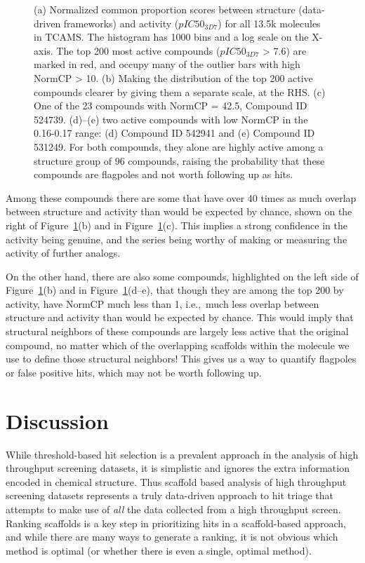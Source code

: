 \documentclass[journal=jacsat,manuscript=article]{achemso}
\newcommand*\fref[1]{Figure~\ref{fig:#1}}
\newcommand*\ie{i.e.,~}
\begin{document}
\begin{figure}
  \caption{(a) Normalized common proportion scores between structure (data-driven frameworks) and activity ($pIC50_{3D7}$) for all 13.5k molecules in TCAMS.  The histogram has 1000 bins and a log scale on the X-axis. The top 200 most active compounds ($pIC50_{3D7}$ > 7.6) are marked in red, and occupy many of the outlier bars with high NormCP > 10. (b) Making the distribution of the top 200 active compounds clearer by giving them a separate scale, at the RHS. (c) One of the 23 compounds with NormCP = 42.5, Compound ID 524739. (d)--(e) two active compounds with low NormCP in the 0.16-0.17 range: (d) Compound ID 542941 and (e) Compound ID 531249. For both compounds, they alone are highly active among a structure group of 96 compounds, raising the probability that these compounds are flagpoles and not worth following up as hits.}
\label{fig:NormCP}   
\end{figure}

Among these compounds there are some that have over 40 times as much overlap between structure and activity than would be expected by chance, shown on the right of \fref{NormCP}(b) and in \fref{NormCP}(c).  This implies a strong confidence in the activity being genuine, and the series being worthy of making or measuring the activity of further analogs.

On the other hand, there are also some compounds, highlighted on the left side of \fref{NormCP}(b) and in \fref{NormCP}(d--e), that though they are among the top 200 by activity, have NormCP much less than 1, \ie much less overlap between structure and activity than would be expected by chance.  This would imply that structural neighbors of these compounds are largely less active that the original compound, no matter which of the overlapping scaffolds within the molecule we use to define those structural neighbors!  This gives us a way to quantify flagpoles or false positive hits, which may not be worth following up.

\section{Discussion}
\label{sec:discussion}

While threshold-based hit selection is a prevalent approach in the
analysis of high throughput screening datasets, it is simplistic and
ignores the extra information encoded in chemical structure. Thus
scaffold based analysis of high throughput screening datasets
represents a truly data-driven approach to hit triage that attempts to
make use of \emph{all} the data collected from a high throughput
screen. Ranking scaffolds is a key step in prioritizing hits in a
scaffold-based approach, and while there are many ways to generate a
ranking, it is not obvious which method is optimal (or whether there
is even a single, optimal method).
\end{document}
